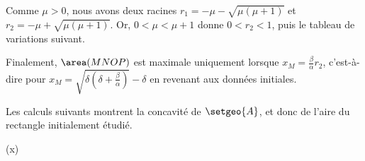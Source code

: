 Comme $\mu > 0$, nous avons deux racines
$r_1 = - \mu - \sqrt{\mu (\mu + 1)}$
et
$r_2 = - \mu + \sqrt{\mu (\mu + 1)}$.
Or,
$0 < \mu < \mu + 1$
donne
$0 < r_2 < 1$,
puis
le tableau de variations suivant.
%
\begin{center}
\end{center}


Finalement,
$\area(MNOP)$ est maximale uniquement lorsque 
$x_M = \frac{\beta}{\alpha} r_2$,
c'est-à-dire pour %
$x_M = \sqrt{\delta (\delta + \frac{\beta}{\alpha})} - \delta$
en revenant aux données initiales.


\begin{remark}
	Les calculs suivants montrent la concavité de $\setgeo{A}$, et donc de l'aire du rectangle initialement étudié.

	\begin{stepcalc}[style=sar]
    	(x)
    \explnext{}
    \explnext{}
    \explnext{}
    \end{stepcalc}
\end{remark}
